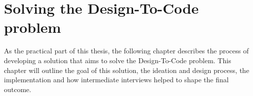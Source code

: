 \newpage
\section{Solving the Design-To-Code problem}
As the practical part of this thesis, the following chapter describes the process of developing a
solution that aims to solve the Design-To-Code problem. This chapter will outline the goal of this
solution, the ideation and design process, the implementation and how intermediate interviews helped
to shape the final outcome. 







